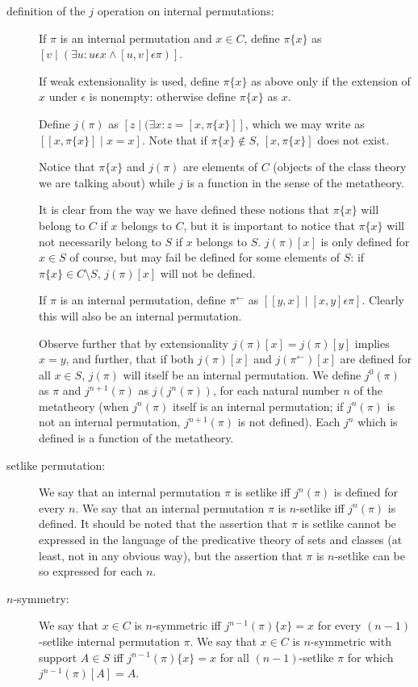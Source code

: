 \documentclass[12pt]{article}
\begin{document}
\begin{description}

\item[definition of the $j$ operation on internal permutations:]   If $\pi$ is an internal permutation and $x \in C$, define $\pi\{x\}$ as $[v\mid (\exists u:u \epsilon x \wedge [u,v] \epsilon \pi)]$.

If weak extensionality is used, define $\pi\{x\}$ as above only if the extension of $x$ under $\epsilon$ is nonempty:  otherwise define $\pi\{x\}$ as $x$.

Define $j(\pi)$ as $[z\mid (\exists x: z=[x,\pi\{x\}]]$, which we may write as $[[x,\pi\{x\}]\mid x=x]$.  Note that if $\pi\{x\} \not\in S$, $[x,\pi\{x\}]$ does not exist.

Notice that $\pi\{x\}$ and $j(\pi)$ are elements of $C$ (objects of the class theory we are talking about)  while $j$ is a function in the sense of the metatheory.  

It is clear from the way we have defined these notions that $\pi\{x\}$ will belong to $C$ if $x$ belongs to $C$, but it is important to notice that $\pi\{x\}$ will not necessarily belong to $S$ if $x$ belongs to $S$.   $j(\pi)[x]$ is only defined for $x \in S$ of course, but may fail be defined for some elements of $S$:  if $\pi\{x\} \in C \setminus S$, $j(\pi)[x]$ will not be defined.  

If $\pi$ is an internal permutation, define $\pi^{\leftarrow}$ as $[[y,x]\mid [x,y]\epsilon \pi]$.   Clearly this will also be an internal permutation.

Observe further that by extensionality $j(\pi)[x]=j(\pi)[y]$ implies $x=y$, and further, that if both $j(\pi)[x]$ and
$j(\pi^{\leftarrow})[x]$ are defined for all $x \in S$, $j(\pi)$ will itself be an internal permutation.  We define $j^0(\pi)$ as $\pi$ and $j^{n+1}(\pi)$ as $j(j^n(\pi))$, for each natural number $n$ of the metatheory (when $j^n(\pi)$ itself is an internal permutation; if $j^n(\pi)$ is not an internal permutation, $j^{n+1}(\pi)$ is not defined).  Each $j^n$ which is defined is a function of the metatheory.

\item[setlike permutation:]  We say that an internal permutation $\pi$ is setlike iff $j^n(\pi)$ is defined for every $n$.   We say that an internal permutation $\pi$ is $n$-setlike iff
$j^n(\pi)$ is defined.   It should be noted that the assertion that $\pi$ is setlike cannot be expressed in the language of the predicative theory of sets and classes (at least, not in any obvious way), but the assertion
that $\pi$ is $n$-setlike can be so expressed for each $n$.

\item[$n$-symmetry:]  We say that $x \in C$ is $n$-symmetric iff $j^{n-1}(\pi)\{x\}=x$ for every $(n-1)$-setlike internal permutation $\pi$.  We say that $x \in C$ is $n$-symmetric with support
$A\in S$  iff  $j^{n-1}(\pi)\{x\}=x$ for all $(n-1)$-setlike $\pi$ for which $j^{n-1}(\pi)[A]=A$.

\end{description}
\end{document}
